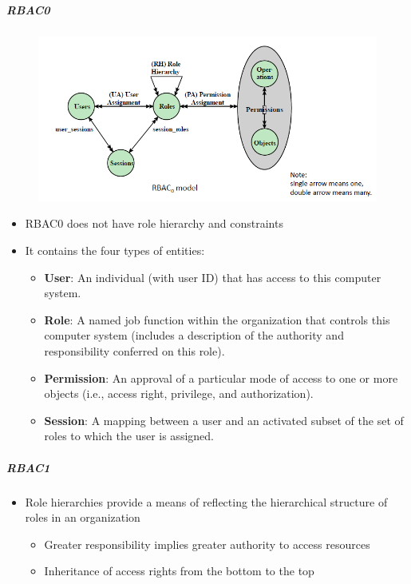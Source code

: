 \documentclass{article}
\begin{document}
            \subparagraph{RBAC0}
                    \begin{figure}[h]
                        \begin{center}
                            \includegraphics[scale=0.6]{../immagini/RBAC0.png}
                        \end{center}
                    \end{figure}

                    \begin{itemize}
                        \item RBAC0 does not have role hierarchy and constraints
                        \item It contains the four types of entities:
                        \begin{itemize}
                            \item \textbf{User}: An individual (with user ID) that has access to this computer system.
                            \item \textbf{Role}: A named job function within the organization that controls this computer system (includes a description of the authority and responsibility conferred on this role).
                            \item \textbf{Permission}: An approval of a particular mode of access to one or more objects (i.e., access right, privilege, and authorization).
                            \item \textbf{Session}: A mapping between a user and an activated subset of the set of roles to which the user is assigned.
                        \end{itemize}
                    \end{itemize}
                
            \subparagraph{RBAC1}
            \begin{itemize}
                \item Role hierarchies provide a means of reflecting the hierarchical structure of roles in an organization
                \begin{itemize}
                    \item Greater responsibility implies greater authority to access resources
                    \item Inheritance of access rights from the bottom to the top
                \end{itemize}
            \end{itemize}
\end{document}
